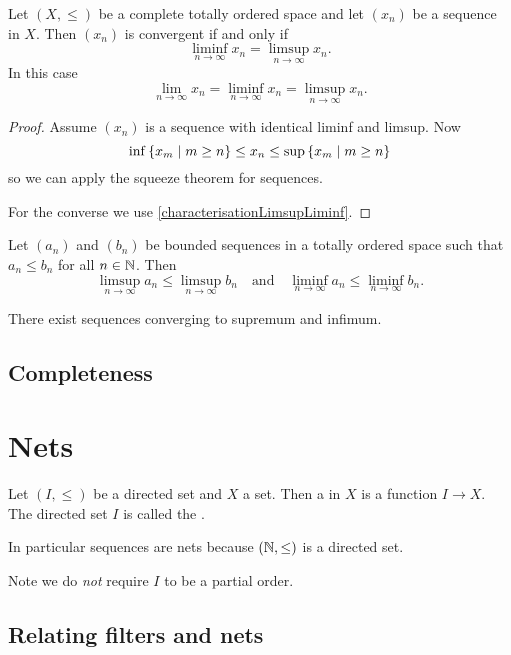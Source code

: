\begin{proposition}
Let $(X,\leq)$ be a complete totally ordered space and let $(x_n)$ be a sequence in $X$. Then $(x_n)$ is convergent \textup{if and only if}
\[ \liminf_{n\to \infty} x_n = \limsup_{n\to \infty} x_n. \]
In this case
\[ \lim_{n\to \infty} x_n = \liminf_{n\to \infty} x_n = \limsup_{n\to \infty} x_n. \]
\end{proposition}
\begin{proof}
Assume $(x_n)$ is a sequence with identical liminf and limsup. Now
\[ \inf\left\{ x_m \;\middle|\; m\geq n \right\} \leq x_n \leq \sup\left\{ x_m \;\middle|\; m\geq n \right\} \]
so we can apply the squeeze theorem for sequences.

For the converse we use \ref{characterisationLimsupLiminf}.
\end{proof}

\begin{lemma} \label{monotonicityLimsupLiminf}
Let $(a_n)$ and $(b_n)$ be bounded sequences in a totally ordered space such that $a_n\leq b_n$ for all $n\in\mathbb{N}$. Then
\[ \limsup_{n\to \infty}a_n \leq \limsup_{n\to \infty}b_n \quad\text{and}\quad \liminf_{n\to \infty}a_n \leq \liminf_{n\to \infty}b_n. \]
\end{lemma}








\begin{lemma} \label{sequencesSupInf}
There exist sequences converging to supremum and infimum.
\end{lemma}

\subsection{Completeness}


\section{Nets}
\begin{definition}
Let $(I,\leq)$ be a directed set and $X$ a set. Then a  in $X$ is a function $I\to X$. The directed set $I$ is called the .
\end{definition}
In particular sequences are nets because $(\mathbb{N},\leq)$ is a directed set.

Note we do \emph{not} require $I$ to be a partial order.

\subsection{Relating filters and nets}
